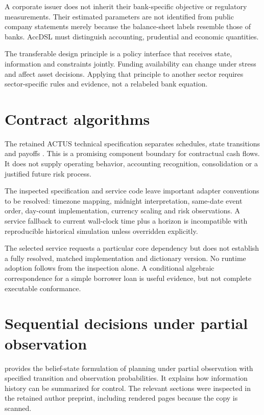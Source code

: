 A corporate issuer does not inherit their bank-specific objective or regulatory measurements. Their estimated parameters are not identified from public company statements merely because the balance-sheet labels resemble those of banks. AccDSL must distinguish accounting, prudential and economic quantities.

The transferable design principle is a policy interface that receives state, information and constraints jointly. Funding availability can change under stress and affect asset decisions. Applying that principle to another sector requires sector-specific rules and evidence, not a relabeled bank equation.

\section{Contract algorithms}
The retained ACTUS technical specification separates schedules, state transitions and payoffs \citep{actus}. This is a promising component boundary for contractual cash flows. It does not supply operating behavior, accounting recognition, consolidation or a justified future risk process.

The inspected specification and service code leave important adapter conventions to be resolved: timezone mapping, midnight interpretation, same-date event order, day-count implementation, currency scaling and risk observations. A service fallback to current wall-clock time plus a horizon is incompatible with reproducible historical simulation unless overridden explicitly.

The selected service requests a particular core dependency but does not establish a fully resolved, matched implementation and dictionary version. No runtime adoption follows from the inspection alone. A conditional algebraic correspondence for a simple borrower loan is useful evidence, but not complete executable conformance.

\section{Sequential decisions under partial observation}
\citet{kaelbling1998} provides the belief-state formulation of planning under partial observation with specified transition and observation probabilities. It explains how information history can be summarized for control. The relevant sections were inspected in the retained author preprint, including rendered pages because the copy is scanned.

